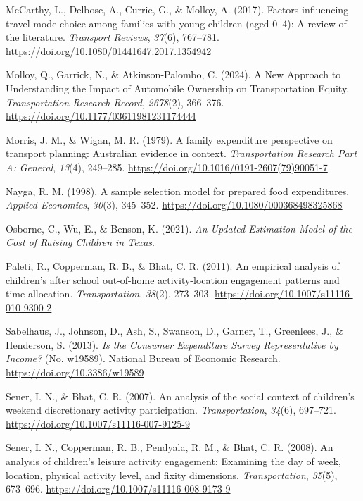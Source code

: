 \documentclass[
]{agujournal2019}
\newlength{\cslhangindent}
\newenvironment{CSLReferences}[2] %
 {\begin{list}{}{%
  \setlength{\itemindent}{0pt}
  \setlength{\leftmargin}{0pt}
  \setlength{\parsep}{0pt}
  \ifodd #1
   \setlength{\leftmargin}{\cslhangindent}
   \setlength{\itemindent}{-1\cslhangindent}
  \fi
  \setlength{\itemsep}{#2\baselineskip}}}
 {\end{list}}
\begin{document}
\begin{CSLReferences}{1}{0}
McCarthy, L., Delbosc, A., Currie, G., \& Molloy, A. (2017). Factors
influencing travel mode choice among families with young children (aged
0--4): A review of the literature. \emph{Transport Reviews},
\emph{37}(6), 767--781.
\url{https://doi.org/10.1080/01441647.2017.1354942}

Molloy, Q., Garrick, N., \& Atkinson-Palombo, C. (2024). A {New}
{Approach} to {Understanding} the {Impact} of {Automobile} {Ownership}
on {Transportation} {Equity}. \emph{Transportation Research Record},
\emph{2678}(2), 366--376.
\url{https://doi.org/10.1177/03611981231174444}

Morris, J. M., \& Wigan, M. R. (1979). A family expenditure perspective
on transport planning: {Australian} evidence in context.
\emph{Transportation Research Part A: General}, \emph{13}(4), 249--285.
\url{https://doi.org/10.1016/0191-2607(79)90051-7}

Nayga, R. M. (1998). A sample selection model for prepared food
expenditures. \emph{Applied Economics}, \emph{30}(3), 345--352.
\url{https://doi.org/10.1080/000368498325868}

Osborne, C., Wu, E., \& Benson, K. (2021). \emph{An {Updated}
{Estimation} {Model} of the {Cost} of {Raising} {Children} in {Texas}}.

Paleti, R., Copperman, R. B., \& Bhat, C. R. (2011). An empirical
analysis of children's after school out-of-home activity-location
engagement patterns and time allocation. \emph{Transportation},
\emph{38}(2), 273--303. \url{https://doi.org/10.1007/s11116-010-9300-2}

Sabelhaus, J., Johnson, D., Ash, S., Swanson, D., Garner, T., Greenlees,
J., \& Henderson, S. (2013). \emph{Is the {Consumer} {Expenditure}
{Survey} {Representative} by {Income}?} (No. w19589). National Bureau of
Economic Research. \url{https://doi.org/10.3386/w19589}

Sener, I. N., \& Bhat, C. R. (2007). An analysis of the social context
of children's weekend discretionary activity participation.
\emph{Transportation}, \emph{34}(6), 697--721.
\url{https://doi.org/10.1007/s11116-007-9125-9}

Sener, I. N., Copperman, R. B., Pendyala, R. M., \& Bhat, C. R. (2008).
An analysis of children's leisure activity engagement: Examining the day
of week, location, physical activity level, and fixity dimensions.
\emph{Transportation}, \emph{35}(5), 673--696.
\url{https://doi.org/10.1007/s11116-008-9173-9}


\end{CSLReferences}
\end{document}
